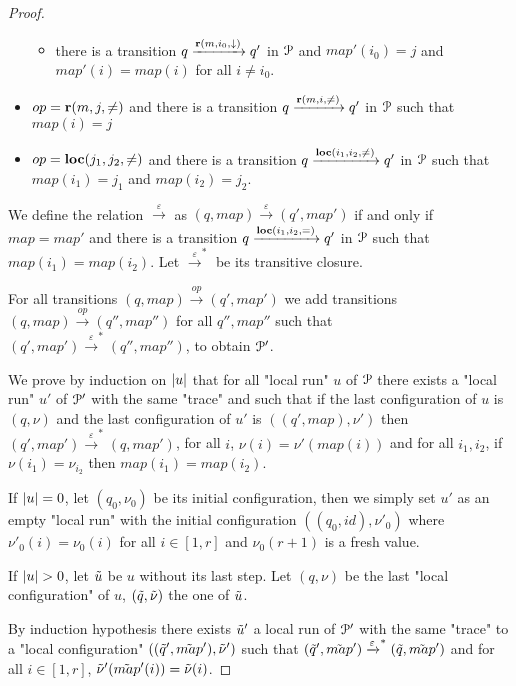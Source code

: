 \begin{proof}
\begin{itemize}
\begin{itemize}
			\item there is a transition $q \xrightarrow{\textbf{r}(m, i_0, \downarrow)} q'$ in $\mathcal{P}$ and $map'(i_0)=j$ and $map'(i) = map(i)$ for all $i \neq i_0$.
		\end{itemize} 
		
		\item $op = \textbf{r}(m, j, {\ne})$ and there is a transition $q \xrightarrow{\textbf{r}(m, i, {\ne})} q'$ in $\mathcal{P}$ such that $map(i)=j$
		
		\item $op=\textbf{loc}(j_1,j_2,{\ne})$ and there is a transition $q \xrightarrow{\textbf{loc}(i_1,i_2,{\ne})} q'$ in $\mathcal{P}$ such that $map(i_1)=j_1$ and $map(i_2) = j_2$.
	\end{itemize}

	
	We define the relation $\xrightarrow{\varepsilon}$ as $(q, map) \xrightarrow{\varepsilon} (q', map')$ if and only if $map=map'$ and there is a transition $q \xrightarrow{\textbf{loc}(i_1,i_2,{=})} q'$ in $\mathcal{P}$ such that $map(i_1)=map(i_2)$.
	Let $\xrightarrow{\varepsilon}^*$ be its transitive closure.
	
	For all transitions $(q,map) \xrightarrow{op} (q', map')$ we add transitions $(q,map) \xrightarrow{op} (q'', map'')$ for all $q'', map''$ such that $(q', map') \xrightarrow{\varepsilon}^* (q'', map'')$, to obtain $\mathcal{P}'$.
	
	We prove by induction on $|u|$ that for all "local run" $u$ of $\mathcal{P}$ there exists a "local run" $u'$ of $\mathcal{P}'$ with the same "trace" and such that if the last configuration of $u$ is $(q,\nu)$ and the last configuration of $u'$ is $((q',map), \nu')$ then $(q', map') \xrightarrow{\varepsilon}^* (q, map')$, for all $i$, $\nu(i) = \nu'(map(i))$ and for all $i_1, i_2$, if $\nu(i_1)=\nu_{i_2}$ then $map(i_1) = map(i_2)$.  
	
	If $|u| = 0$, let $(q_0, \nu_0)$ be its initial configuration, then we simply set $u'$ as an empty "local run" with the initial configuration $((q_0, id), \nu'_0)$ where $\nu'_0(i) = \nu_0(i)$ for all $i \in [1,r]$ and $\nu_0(r+1)$ is a fresh value.
	
	If $\size{u}>0$, let $\Tilde{u}$ be $u$ without its last step. Let $(q, \nu)$ be the last "local configuration" of $u$, $(\Tilde{q}, \Tilde{\nu})$ the one of $\Tilde{u}$.
	
	By induction hypothesis there exists $\Tilde{u}'$ a local run of $\mathcal{P}'$ with the same "trace" to a "local configuration" $((\Tilde{q}', \Tilde{map}'), \Tilde{\nu}')$ such that $(\Tilde{q}', \Tilde{map}') \xrightarrow{\varepsilon}^* (\Tilde{q}, \Tilde{map}')$ and for all $i \in [1,r]$, $\Tilde{\nu}'(\Tilde{map}'(i)) = \Tilde{\nu}(i)$.
	

\end{proof}
